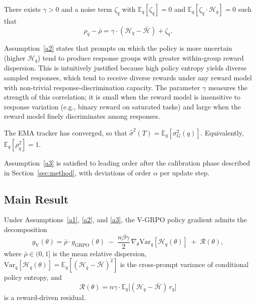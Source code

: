 \documentclass[10pt]{article}
\begin{document}
\begin{assumption}
\label{a2}
There exists $\gamma > 0$ and a noise term $\zeta_q$ with $\mathbb{E}_q[\zeta_q] = 0$
and $\mathbb{E}_q[\zeta_q \cdot \mathcal{H}_q] = 0$ such that
\begin{equation}
\rho_q - \bar\rho = \gamma \cdot (\mathcal{H}_q - \bar{\mathcal{H}}) + \zeta_q.
\label{eq:a2}
\end{equation}
\end{assumption}

\begin{remark}
Assumption~\ref{a2} states that prompts on which the policy is more uncertain
(higher $\mathcal{H}_q$) tend to produce response groups with greater within-group
reward dispersion. This is intuitively justified because high policy entropy
yields diverse sampled responses, which tend to receive diverse rewards under
any reward model with non-trivial response-discrimination capacity. The
parameter $\gamma$ measures the strength of this correlation; it is small
when the reward model is insensitive to response variation (e.g., binary
reward on saturated tasks) and large when the reward model finely
discriminates among responses.
\end{remark}

\begin{assumption}
\label{a3}
The EMA tracker has converged, so that $\hat\sigma^2(T) = \mathbb{E}_q[\sigma_G^2(q)]$.
Equivalently, $\mathbb{E}_q[\rho_q^2] = 1$.
\end{assumption}

Assumption~\ref{a3} is satisfied to leading order after the calibration phase
described in Section~\ref{sec:method}, with deviations of order $\alpha$ per
update step.

\subsection{Main Result}
\label{sec:theory:main}

\begin{proposition}
\label{prop:main}
Under Assumptions~\ref{a1}, \ref{a2}, and \ref{a3}, the V-GRPO policy
gradient admits the decomposition
\begin{equation}
g_{\text{V}}(\theta)
= \bar\rho \cdot g_{\text{GRPO}}(\theta)
\;-\; \frac{n \beta \gamma}{2}\, \nabla_\theta \mathrm{Var}_q[\mathcal{H}_q(\theta)]
\;+\; \mathcal{R}(\theta),
\label{eq:main}
\end{equation}
where $\bar\rho \in (0, 1]$ is the mean relative dispersion,
$\mathrm{Var}_q[\mathcal{H}_q(\theta)] = \mathbb{E}_q[(\mathcal{H}_q - \bar{\mathcal{H}})^2]$
is the cross-prompt variance of conditional policy entropy, and
\begin{equation}
\mathcal{R}(\theta) = n \gamma \cdot \mathbb{E}_q\big[(\mathcal{H}_q - \bar{\mathcal{H}})\, r_q\big]
\label{eq:residual}
\end{equation}
is a reward-driven residual.
\end{proposition}
\end{document}
